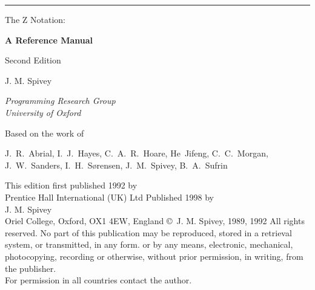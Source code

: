 %
%
% 
%

	\makeindex \makeglossary \makesymdex


\setcounter{page}{3}	%

\thispagestyle{empty}
{\parindent=0pt \parskip=0pt
\hrule height0pt
\vskip 21pt
{\Hugebf The Z Notation:\par}
\vskip 14pt
{\LARGE\bf A Reference Manual\par}
\vskip 14pt
{\large Second Edition\par}
\vskip 28pt
{\Large J. M. Spivey\par}
\vskip 7pt
{\it Programming Research Group\\
  University of Oxford\par}
\vskip 28pt
{\large Based on the work of\par}
\vskip 7pt
{\hsize \large \raggedright \noindent
	J.~R.~Abrial, I.~J.~Hayes, C.~A.~R.~Hoare,
	He~Jifeng, C.~C.~Morgan, J.~W.~Sanders,
	I.~H.~S\o rensen, J.~M.~Spivey, B.~A.~Sufrin \par}}
\clearpage

\thispagestyle{empty}
{\raggedright
\noindent
This edition first published 1992 by\\
Prentice Hall International (UK) Ltd
\vskip 14pt
\noindent
Published 1998 by\\
J. M. Spivey\\
Oriel College, Oxford, OX1 4EW, England
\vskip 14pt
\noindent
\copyright\ J. M. Spivey, 1989, 1992
\vskip 14pt
\noindent
All rights reserved. No part of this publication may be reproduced,
stored in a retrieval system, or transmitted, in any form. or by any
means, electronic, mechanical, photocopying, recording or otherwise,
without prior permission, in writing, from the publisher.\\
For permission in all countries contact the author.
\clearpage}

